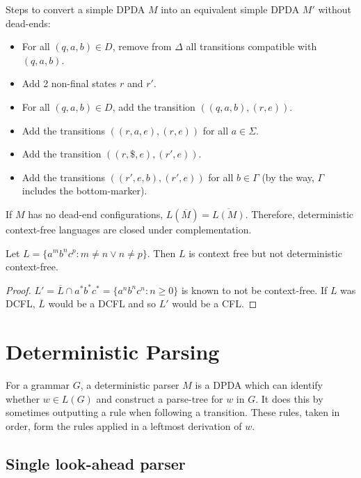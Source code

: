 Steps to convert a simple DPDA $M$ into an equivalent simple DPDA $M'$ without dead-ends:
\begin{itemize}
\item For all $(q, a, b) \in D$, remove from $\Delta$ all transitions compatible with $(q, a, b)$.
\item Add 2 non-final states $r$ and $r'$.
\item For all $(q, a, b) \in D$, add the transition $((q, a, b), (r, e))$.
\item Add the transitions $((r, a, e), (r, e))$ for all $a \in \Sigma$.
\item Add the transition $((r, \$, e), (r', e))$.
\item Add the transitions $((r', e, b), (r', e))$ for all $b \in \Gamma$
    (by the way, $\Gamma$ includes the bottom-marker).
\end{itemize}

If $M$ has no dead-end configurations, $L(\overline{M}) = \overline{L(M)}$.
Therefore, deterministic context-free languages are closed under complementation.

\begin{theorem}
Let $L = \{a^mb^nc^p: m \neq n \vee n \neq p\}$. Then $L$ is context free but not deterministic context-free.
\end{theorem}
\begin{proof}
$L' = \overline{L}\cap a^*b^*c^* = \{a^nb^nc^n: n \ge 0\}$ is known to not be context-free.
If $L$ was DCFL, $\overline{L}$ would be a DCFL and so $L'$ would be a CFL.
\end{proof}

\section{Deterministic Parsing}

\begin{definition}
For a grammar $G$, a deterministic parser $M$ is a DPDA which can
identify whether $w \in L(G)$ and construct a parse-tree for $w$ in $G$.
It does this by sometimes outputting a rule when following a transition.
These rules, taken in order, form the rules applied in a leftmost derivation of $w$.
\end{definition}

\subsection{Single look-ahead parser}

